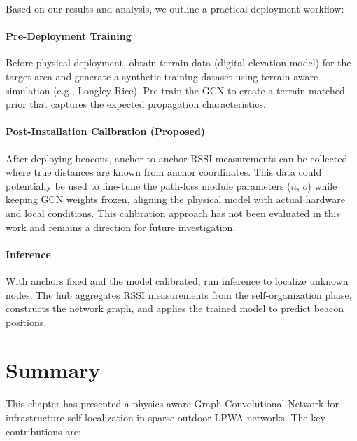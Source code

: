 \documentclass[master,final,11pt]{iscs-thesis}
\begin{document}
Based on our results and analysis, we outline a practical deployment workflow:

\paragraph{Pre-Deployment Training}
Before physical deployment, obtain terrain data (digital elevation model) for the target area and generate a synthetic training dataset using terrain-aware simulation (e.g., Longley-Rice).
Pre-train the GCN to create a terrain-matched prior that captures the expected propagation characteristics.

\paragraph{Post-Installation Calibration (Proposed)}
After deploying beacons, anchor-to-anchor RSSI measurements can be collected where true distances are known from anchor coordinates.
This data could potentially be used to fine-tune the path-loss module parameters ($n$, $o$) while keeping GCN weights frozen, aligning the physical model with actual hardware and local conditions.
This calibration approach has not been evaluated in this work and remains a direction for future investigation.

\paragraph{Inference}
With anchors fixed and the model calibrated, run inference to localize unknown nodes.
The hub aggregates RSSI measurements from the self-organization phase, constructs the network graph, and applies the trained model to predict beacon positions.

\section{Summary}
\label{sec:infra_summary}

This chapter has presented a physics-aware Graph Convolutional Network for infrastructure self-localization in sparse outdoor LPWA networks.
The key contributions are:
\end{document}
